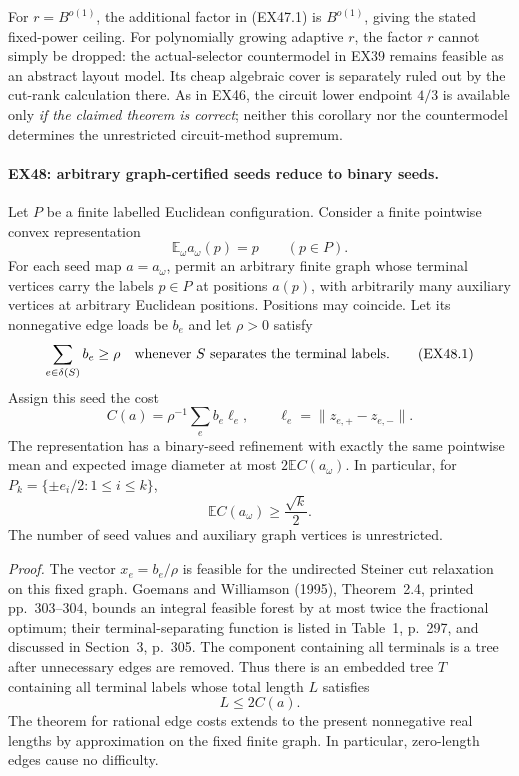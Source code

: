 For $r=B^{o(1)}$, the additional factor in (EX47.1) is
$B^{o(1)}$, giving the stated fixed-power ceiling. For polynomially
growing adaptive $r$, the factor $r$ cannot simply be dropped: the
actual-selector countermodel in EX39 remains feasible as an abstract
layout model. Its cheap algebraic cover is separately ruled out by
the cut-rank calculation there. As in EX46, the circuit lower
endpoint $4/3$ is available only \emph{if the claimed theorem is
correct}; neither this corollary nor the countermodel determines the
unrestricted circuit-method supremum.


\paragraph{EX48: arbitrary graph-certified seeds reduce to binary seeds.}
\label{ex:graph-seed-reduction}
Let $P$ be a finite labelled Euclidean configuration.  Consider a finite
pointwise convex representation
\[
                    \mathbb E_\omega a_\omega(p)=p
                       \qquad(p\in P).
\]
For each seed map $a=a_\omega$, permit an arbitrary finite graph whose
terminal vertices carry the labels $p\in P$ at positions $a(p)$, with
arbitrarily many auxiliary vertices at arbitrary Euclidean positions.
Positions may coincide.  Let its nonnegative edge loads be $b_e$ and
let $\rho>0$ satisfy
\[
       \sum_{e\in\delta(S)}b_e\ge\rho
       \quad\hbox{whenever $S$ separates the terminal labels}.
       \tag{EX48.1}
\]
Assign this seed the cost
\[
                  C(a)=\rho^{-1}\sum_e b_e\ell_e,
       \qquad \ell_e=\|z_{e,+}-z_{e,-}\|.
\]
The representation has a binary-seed refinement with exactly the same
pointwise mean and expected image diameter at most
$2\mathbb E C(a_\omega)$.  In particular, for
$P_k=\{\pm e_i/2:1\le i\le k\}$,
\[
                         \mathbb E C(a_\omega)\ge\frac{\sqrt k}{2}.
                         \tag{EX48.2}
\]
The number of seed values and auxiliary graph vertices is unrestricted.

\emph{Proof.}
The vector $x_e=b_e/\rho$ is feasible for the undirected Steiner cut
relaxation on this fixed graph.  Goemans and Williamson (1995),
Theorem~2.4, printed pp.~303--304, bounds an integral feasible forest
by at most twice the fractional optimum; their terminal-separating
function is listed in Table~1, p.~297, and discussed in Section~3,
p.~305.  The component containing all terminals is a tree after
unnecessary edges are removed.  Thus there is an embedded tree $T$
containing all terminal labels whose total length $L$ satisfies
\[
                             L\le2C(a).
                             \tag{EX48.3}
\]
The theorem for rational edge costs extends to the present nonnegative
real lengths by approximation on the fixed finite graph.  In particular,
zero-length edges cause no difficulty.

